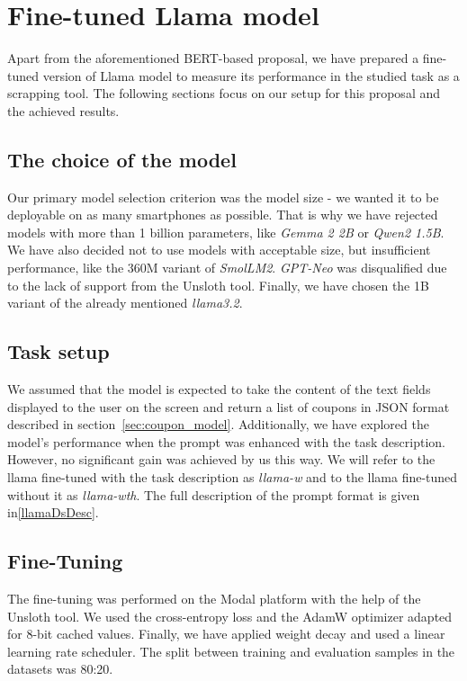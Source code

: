 \documentclass[licencjacka,en]{pracamgr}
\begin{document}
\chapter{Fine-tuned Llama model}
Apart from the aforementioned BERT-based proposal, we have prepared a fine-tuned version of Llama\cite{meta-llama} model to measure its performance in the studied task as a scrapping tool. The following sections focus on our setup for this proposal and the achieved results.

\section{The choice of the model}
Our primary model selection criterion was the model size - we wanted it to be deployable on as many smartphones as possible. That is why we have rejected models with more than 1 billion parameters, like \emph{Gemma 2 2B}\cite{gemma2} or \emph{Qwen2 1.5B}\cite{yang2024qwen2technicalreport}. We have also decided not to use models with acceptable size, but insufficient performance, like the 360M variant of \emph{SmolLM2}\cite{smollm2}. \emph{GPT-Neo}\cite{gpt-neo} was disqualified due to the lack of support from the Unsloth tool. Finally, we have chosen the 1B variant of the already mentioned \emph{llama3.2}.

\section{Task setup}
We assumed that the model is expected to take the content of the text fields displayed to the user on the screen and return a list of coupons in JSON format described in section~\ref{sec:coupon_model}. Additionally, we have explored the model's performance when the prompt was enhanced with the task description. However, no significant gain was achieved by us this way. We will refer to the llama fine-tuned with the task description as \emph{llama-w} and to the llama fine-tuned without it as \emph{llama-wth}. The full description of the prompt format is given in\ref{llamaDsDesc}.
\section{Fine-Tuning}
The fine-tuning was performed on the Modal platform with the help of the Unsloth tool. We used the cross-entropy loss\cite{mao2023crossentropylossfunctionstheoretical} and the AdamW optimizer adapted for 8-bit cached values\cite{hf-bnb}. Finally, we have applied weight decay and used a linear learning rate scheduler. The split between training and evaluation samples in the datasets was 80:20.
\end{document}
